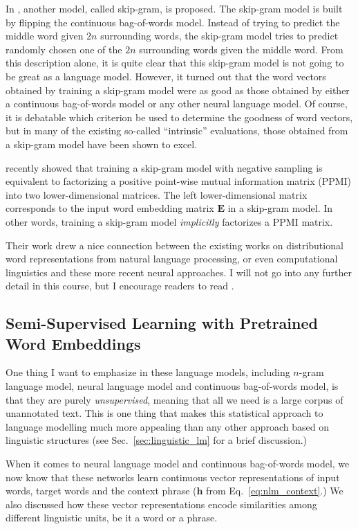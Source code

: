 \documentclass{report}
\newcommand{\vect}[1]{\mathbf{#1}}
\newcommand{\matr}[1]{\mathbf{#1}}
\newcommand{\vh}[0]{\vect{h}}
\newcommand{\mE}[0]{\matr{E}}
\begin{document}
In \citet{mikolov2013efficient}, another model, called skip-gram, is proposed.
The skip-gram model is built by flipping the continuous bag-of-words model.
Instead of trying to predict the middle word given $2n$ surrounding words, the
skip-gram model tries to predict randomly chosen one of the $2n$ surrounding
words given the middle word. From this description alone, it is quite clear that
this skip-gram model is not going to be great as a language model. However, it
turned out that the word vectors obtained by training a skip-gram model were as
good as those obtained by either a continuous bag-of-words model or any other
neural language model. Of course, it is debatable which criterion be used to
determine the goodness of word vectors, but in many of the existing so-called
``intrinsic'' evaluations, those obtained from a skip-gram model have been shown
to excel.

\citet{Omer2014} recently showed that training a skip-gram model
with negative sampling \citep[see][]{mikolov2013efficient} is equivalent to
factorizing a positive point-wise mutual information matrix (PPMI) into two
lower-dimensional matrices. The left lower-dimensional matrix corresponds to the
input word embedding matrix $\mE$ in a skip-gram model. In other words, training
a skip-gram model {\em implicitly} factorizes a PPMI matrix. 

Their work drew a nice connection between the existing works on distributional word
representations from natural language processing, or even computational
linguistics and these more recent neural approaches. I will not go into any
further detail in this course, but I encourage readers to read \citet{Omer2014}.


\subsection{Semi-Supervised Learning with Pretrained Word Embeddings}
\label{sec:semi_emb}

One thing I want to emphasize in these language models, including $n$-gram
language model, neural language model and continuous bag-of-words model, is that
they are purely {\em unsupervised}, meaning that all we need is a large corpus
of unannotated text. This is one thing that makes this statistical approach to
language modelling much more appealing than any other approach based on
linguistic structures (see Sec.~\ref{sec:linguistic_lm} for a brief discussion.) 

When it comes to neural language model and continuous bag-of-words model, we now
know that these networks learn continuous vector representations of input words,
target words and the context phrase ($\vh$ from Eq.~\eqref{eq:nlm_context}.) We
also discussed how these vector representations encode similarities among
different linguistic units, be it a word or a phrase. 
\end{document}
